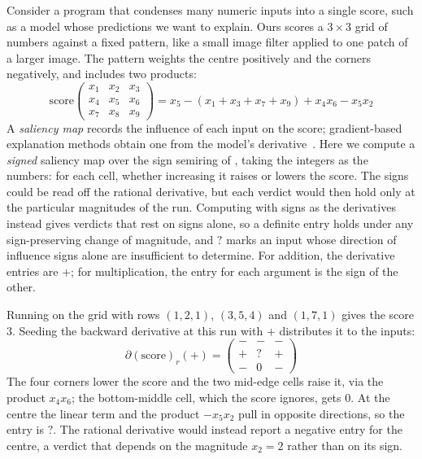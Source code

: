Consider a program that condenses many numeric inputs into a single score, such as a model whose
predictions we want to explain. Ours scores a $3 \times 3$ grid of numbers against a fixed pattern,
like a small image filter applied to one patch of a larger image. The pattern weights the
centre positively and the corners negatively, and includes two products:
\begin{displaymath}
  \mathrm{score}
  \begin{pmatrix} x_1 & x_2 & x_3 \\ x_4 & x_5 & x_6 \\ x_7 & x_8 & x_9 \end{pmatrix}
  = x_5 - (x_1 + x_3 + x_7 + x_9) + x_4 x_6 - x_5 x_2
\end{displaymath}
\noindent A \emph{saliency map} records the influence of each input on the score; gradient-based
explanation methods obtain one from the model's derivative~\cite{selvaraju20}. Here we compute a
\emph{signed} saliency map over the sign semiring of , taking the
integers as the numbers: for each cell, whether increasing it raises or lowers the score. The signs
could be read off the rational derivative, but each verdict would then hold only at the particular
magnitudes of the run. Computing with signs as the derivatives instead gives verdicts that rest on signs
alone, so a definite entry holds under any sign-preserving change of magnitude, and $?$ marks an input
whose direction of influence signs alone are insufficient to determine. For addition, the derivative
entries are $+$; for multiplication, the entry for each argument is the sign of the other.

Running on the grid with rows $(1, 2, 1)$, $(3, 5, 4)$ and $(1, 7, 1)$ gives the score $3$. Seeding
the backward derivative at this run with $+$ distributes it to the inputs:
\begin{displaymath}
  \partial(\mathrm{score})_r(+) =
  \begin{pmatrix} - & - & - \\ + & ? & + \\ - & 0 & - \end{pmatrix}
\end{displaymath}
\noindent The four corners lower the score and the two mid-edge cells raise it, via the product
$x_4 x_6$; the bottom-middle cell, which the score ignores, gets $0$. At the centre the linear term and
the product $-x_5 x_2$ pull in opposite directions, so the entry is $?$. The rational derivative would instead report a negative
entry for the centre, a verdict that depends on the magnitude $x_2 = 2$ rather than on its sign.

